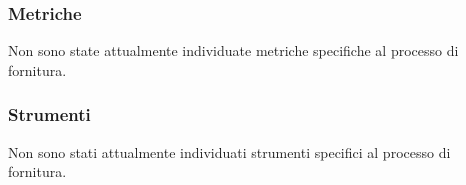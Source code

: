     \subsubsection{Metriche}
    Non sono state attualmente individuate metriche specifiche al processo di fornitura.
    \subsubsection{Strumenti}
    Non sono stati attualmente individuati strumenti specifici al processo di fornitura.
       
    